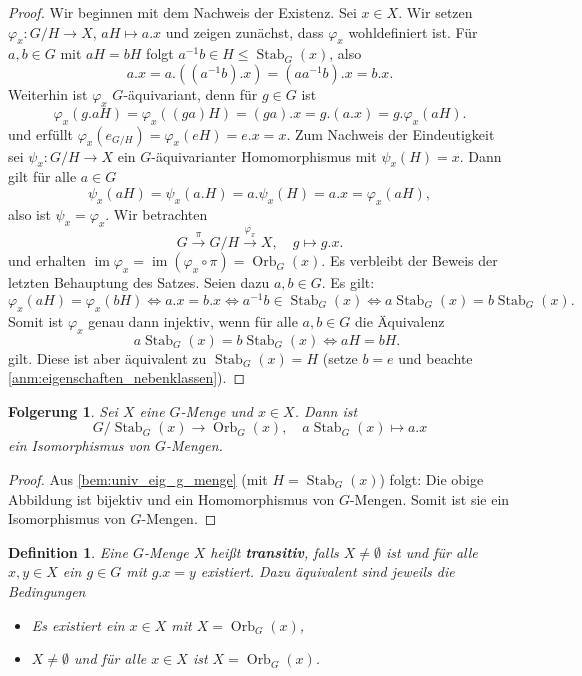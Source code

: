 \documentclass[a4paper, twoside, 11pt, ngerman]{report}
\DeclareMathOperator{\image}{im}
\DeclareMathOperator{\Orb}{Orb}
\DeclareMathOperator{\Stab}{Stab}
\theoremstyle{definistyle}
\newtheorem{defini}[satz]{Definition}
\newtheorem{folgerung}[satz]{Folgerung}
\theoremstyle{remark}
\newcommand{\defn}[1]{\textit{\bfseries #1}}
\begin{document}
\begin{proof}
Wir beginnen mit dem Nachweis der Existenz. Sei $x\in X$. Wir setzen $\varphi_x \colon G / H \to X$, $a H \mapsto a . x$ und zeigen zunächst, dass $\varphi_x$ wohldefiniert ist. Für $a, b \in G$ mit $a H = b H$ folgt $a^{-1} b \in H \leq \Stab_G(x)$, also
\[
a . x = a . ((a^{-1} b) . x) = (a a^{-1}b) . x = b . x.
\]
Weiterhin ist $\varphi_x$ $G$-äquivariant, denn für $g\in G$ ist
\[
\varphi_x(g . a H) = \varphi_x((g a) H) = (g a) . x = g . (a . x) = g . \varphi_x(a H).
\]
und erfüllt $\varphi_x(e_{G/H})=\varphi_x(eH)=e.x=x$.
Zum Nachweis der Eindeutigkeit sei $\psi_x \colon G / H \to X$ ein $G$-äquivarianter Homomorphismus mit $\psi_x(H) = x$. Dann gilt für alle $a \in G$
\[
\psi_x(a H) = \psi_x(a.H)= a . \psi_x(H) = a . x = \varphi_x(a H),
\]
also ist $\psi_x = \varphi_x$. Wir betrachten
\[
G \xrightarrow{\pi} G / H \xrightarrow{\varphi_x} X, \quad g \mapsto g . x.
\]
und erhalten $\image \varphi_x = \image (\varphi_x \circ \pi) = \Orb_G(x)$. Es verbleibt der Beweis der letzten Behauptung des Satzes. Seien dazu $a, b \in G$. Es gilt:
\[
\varphi_x(a H) = \varphi_x(b H) \Leftrightarrow a . x = b . x \Leftrightarrow a^{-1} b \in \Stab_G(x) \Leftrightarrow a \Stab_G(x) = b \Stab_G(x).
\]
Somit ist $\varphi_x$ genau dann injektiv, wenn für alle $a,b\in G$ die Äquivalenz 
\[\quad a \Stab_G(x) = b \Stab_G(x) \iff a H = b H.
\]
gilt. Diese ist aber äquivalent zu $\Stab_G(x) = H$ (setze $b = e$  und beachte \ref{anm:eigenschaften_nebenklassen}).
\end{proof}

\begin{folgerung}\label{folg:isom_orbit}
Sei $X$ eine $G$-Menge und $x \in X$. Dann ist
\[
G / \Stab_G(x) \to \Orb_G(x), \quad a \Stab_G(x) \mapsto a . x
\]
ein Isomorphismus von $G$-Mengen.
\end{folgerung}

\begin{proof}
Aus \ref{bem:univ_eig_g_menge} (mit $H=\Stab_G(x)$) folgt: Die obige Abbildung ist bijektiv und ein Homomorphismus von $G$-Mengen. Somit ist sie ein Isomorphismus von $G$-Mengen.
\end{proof}

\begin{defini}\label{def:transitiv}
Eine $G$-Menge $X$ heißt \defn{transitiv}, falls $X \neq \emptyset$ ist und für alle $x, y \in X$ ein $g \in G$ mit $g . x = y$ existiert. Dazu äquivalent sind jeweils die Bedingungen
\begin{itemize}
\item Es existiert ein $x \in X$ mit $X = \Orb_G(x)$,
\item $X \neq \emptyset$ und für alle $x \in X$ ist $X = \Orb_G(x)$.
\end{itemize}
\end{defini}
\end{document}
